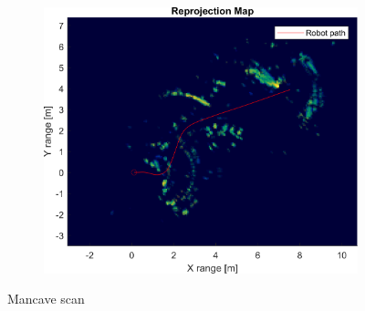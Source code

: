 \begin{figure}[htbp]
\begin{subfigure}[t]{0.475\linewidth}
        \includegraphics[width=\linewidth,max height=.475\textheight]{gfx/results/mancave_reprojection.png}
    \end{subfigure}%
    \caption{Mancave scan}
\end{figure}

